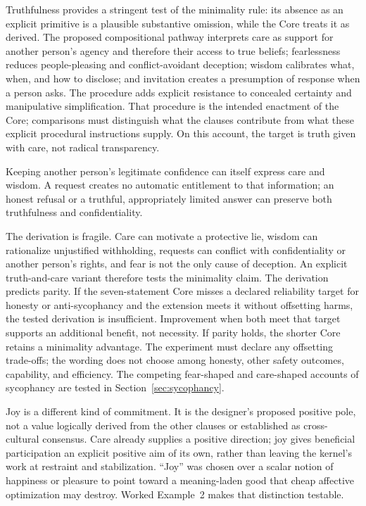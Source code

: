 \documentclass[11pt]{article}
\begin{document}
Truthfulness provides a stringent test of the minimality rule: its absence as an
explicit primitive is a plausible substantive omission, while the Core treats
it as derived. The proposed compositional pathway interprets care as
support for another person's agency and therefore their access to true beliefs; fearlessness reduces
people-pleasing and conflict-avoidant deception; wisdom calibrates what, when,
and how to disclose; and invitation creates a presumption of response when a
person asks. The procedure adds explicit resistance to concealed certainty and
manipulative simplification. That procedure is the intended enactment of
the Core; comparisons must distinguish what the clauses contribute from
what these explicit procedural instructions supply. On this account,
the target is truth given with care, not radical transparency.

Keeping another person's legitimate confidence can itself express care and
wisdom. A request creates no automatic entitlement to that information; an
honest refusal or a truthful, appropriately limited answer can preserve both
truthfulness and confidentiality.

The derivation is fragile. Care can motivate a protective lie, wisdom can
rationalize unjustified withholding, requests can conflict with confidentiality or another
person's rights, and fear is not the only cause of deception. An explicit
truth-and-care variant therefore tests the minimality claim. The derivation
predicts parity. If the
seven-statement Core misses a declared reliability target for honesty or
anti-sycophancy and the extension meets it without offsetting harms, the tested
derivation is insufficient. Improvement when both meet that target supports
an additional benefit, not necessity. If parity holds, the shorter Core
retains a minimality advantage. The experiment must declare any offsetting
trade-offs; the wording does not choose among honesty, other safety outcomes,
capability, and efficiency. The competing fear-shaped and care-shaped
accounts of sycophancy are tested in Section~\ref{sec:sycophancy}.

Joy is a different kind of commitment. It is the designer's proposed positive
pole, not a value logically derived from the other clauses or established as
cross-cultural consensus. Care already supplies a positive direction;
joy gives beneficial participation an explicit positive aim of its own,
rather than leaving the kernel's work at restraint and stabilization.
``Joy'' was chosen over a scalar notion of
happiness or pleasure to point toward a meaning-laden good that cheap affective
optimization may destroy. Worked Example~2 makes that distinction testable.
\end{document}
